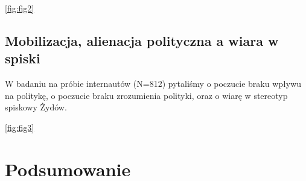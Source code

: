 \documentclass[man]{apa6}
\begin{document}
	\ref{fig:fig2}

	\begin{figure*}[htbp]
   		\centering
   		\caption{Kolektywny narcyzm a prawdopodobieństwo wiary w spisek smoleński wśród osób o różnych nasileniach potrzeby poznawczego domknięcia (NFC).}
   		\label{fig:fig2}
	\end{figure*}


    \subsection{Mobilizacja, alienacja polityczna a wiara w spiski}

    W badaniu na próbie internautów (N=812) pytaliśmy o poczucie braku wpływu na politykę, o poczucie braku zrozumienia polityki, oraz o wiarę w stereotyp spiskowy Żydów.


    	\ref{fig:fig3}

	\begin{figure*}[htbp]
   		\centering
   		\caption{Relacja pomiędzy poczuciem politycznej bezsilność a antysemityzmem spiskowym w badaniu podłużnym z dwoma pomiarami (T1 i T2). Wartości na diagramie oznaczają współczynniki standaryzowane. \\
        *$p$ < 0,05 **$p$ < 0,01 ***$p$ < 0,001}
   		\label{fig:fig3}
	\end{figure*}


    \section{Podsumowanie}


\printbibliography
\end{document}
